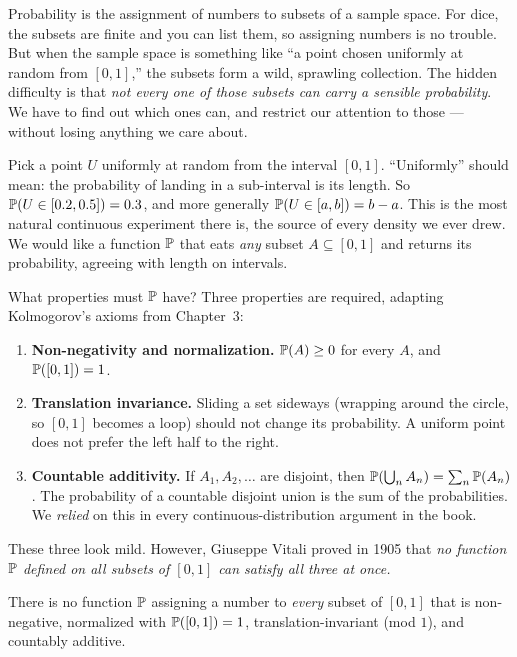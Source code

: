 \begin{intuitionbox}
Probability is the assignment of numbers to subsets of a sample space.
For dice, the subsets are finite and you can list them, so assigning numbers is no
trouble. But when the sample space is something like ``a point chosen uniformly at
random from $[0,1]$,'' the subsets form a wild, sprawling collection. The hidden
difficulty is that \emph{not every one of those subsets can carry a
sensible probability}. We have to find out which ones can, and restrict our
attention to those --- without losing anything we care about.
\end{intuitionbox}

Pick a point $U$ uniformly at random from the
interval $[0,1]$. ``Uniformly'' should mean: the probability of landing in a
sub-interval is its length. So $\P(U \in [0.2,0.5]) = 0.3$, and more generally
$\P(U \in [a,b]) = b-a$. This is the most natural continuous experiment there is,
the source of every density we ever drew. We would like a function $\P$ that eats
\emph{any} subset $A \subseteq [0,1]$ and returns its probability, agreeing with
length on intervals.

What properties must $\P$ have? Three properties are required, adapting
Kolmogorov's axioms from Chapter~3:

\begin{enumerate}
  \item \textbf{Non-negativity and normalization.} $\P(A) \ge 0$ for every $A$,
        and $\P([0,1]) = 1$.
  \item \textbf{Translation invariance.} Sliding a set sideways (wrapping around
        the circle, so $[0,1]$ becomes a loop) should not change its probability.
        A uniform point does not prefer the left half to the right.
  \item \textbf{Countable additivity.} If $A_1, A_2, \dots$ are disjoint, then
        $\P\!\left(\bigcup_n A_n\right) = \sum_n \P(A_n)$. The probability of a
        countable disjoint union is the sum of the probabilities. We \emph{relied}
        on this in every continuous-distribution argument in the book.
\end{enumerate}

These three look mild. However, Giuseppe Vitali proved in 1905 that \emph{no function $\P$ defined on all subsets of $[0,1]$ can satisfy all
three at once.}

\begin{theorem}
\label{ch36:vitali}
There is no function $\P$ assigning a number to \emph{every} subset of $[0,1]$
that is non-negative, normalized with $\P([0,1])=1$, translation-invariant (mod
$1$), and countably additive.
\end{theorem}

